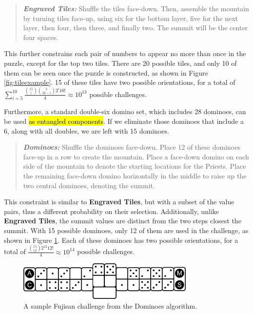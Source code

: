 \documentclass[journal]{IEEEtran}
\begin{document}
\begin{quote}
    
  {\it \bf Engraved Tiles:} Shuffle the tiles face-down. Then, assemble the mountain by turning tiles face-up, using six for the bottom layer, five for the next layer, then four, then three, and finally two. The summit will be the center four spaces.
\end{quote}

This further constrains each pair of numbers to appear no more than once in the puzzle, except for the top two tiles. There are 20 possible tiles, and only 10 of them can be seen once the puzzle is constructed, as shown in Figure \ref{fig:tileexample}. 15 of these tiles have two possible orientations, for a total of $\sum_{i = 5}^{10}\frac{{15 \choose i}\binom{5}{10 - i}2^{i}10!}{4} \approx 10^{13}
$ possible challenges.

Furthermore, a standard double-six domino set, which includes 28 dominoes, 
can be used \hl{as entangled components}. If we eliminate those dominoes that include a 6, along with all doubles, we are left with 15 dominoes. 

\begin{quote}
    
  {\it \bf Dominoes:} Shuffle the dominoes face-down. Place 12 of these dominoes face-up in a row to create the mountain. Place a face-down domino on each side of the mountain to denote the starting locations for the Priests. Place the remaining face-down domino horizontally in the middle to raise up the two central dominoes, denoting the summit.
\end{quote}

This constraint is similar to \textbf{Engraved Tiles}, but with a subset of the value pairs, thus a different probability on their selection.  Additionally, unlike \textbf{Engraved Tiles}, the summit values are distinct from the two steps closest the summit.
With 15 possible dominoes, only 12 of them are used in the challenge, as shown in Figure \ref{fig:dominoexample}. Each of these dominoes has two possible orientations, for a total of $\frac{{15 \choose 12}2^{12}12!}{4} \approx 10^{14}$ possible challenges. 

\begin{figure}[b]
\includegraphics[width=8.8cm]{dominoexample.png}
\caption{A sample Fujisan challenge from the Dominoes algorithm.}
\label{fig:dominoexample}
\end{figure}
\end{document}
